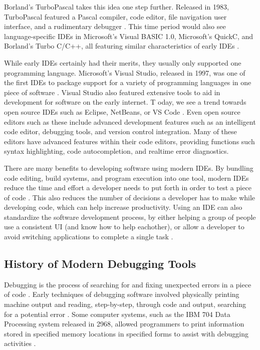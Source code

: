 \documentclass{article}
\begin{document}
Borland's TurboPascal takes this idea one step further. Released in 1983, TurboPascal featured a Pascal compiler, code editor, file navigation user interface, and a rudimentary debugger \cite{Gajic_2017, Intersimone_2010, Wadlow_1984}. This time period would also see language-specific IDEs in Microsoft's Visual BASIC 1.0, Microsoft's QuickC, and Borland's Turbo C/C++, all featuring similar characteristics of early IDEs \cite{Burgwin_2013, Plant_Murrell_2007, Posch_2023, Forer_Petreley_1991}.

While early IDEs certainly had their merits, they usually only supported one programming language. Microsoft's Visual Studio, released in 1997, was one of the first IDEs to package support for a variety of programming languages in one piece of software \cite{Microsoft_1997}. Visual Studio also featured extensive tools to aid in development for software on the early internet. 
T
oday, we see a trend towards open source IDEs such as Eclipse, NetBeans, or VS Code \cite{Apache_2023, EclipseFoundation_2023, Microsoft_2023a}. Even open source editors such as these include advanced development features such as an intelligent code editor, debugging tools, and version control integration. Many of these editors have advanced features within their code editors, providing functions such syntax highlighting, code autocompletion, and realtime error diagnostics. 

There are many benefits to developing software using modern IDEs. By bundling code editing, build systems, and program execution into one tool, modern IDEs reduce the time and effort a developer needs to put forth in order to test a piece of code \cite{Gillis_Silverthorne_2018}. This also reduces the number of decisions a developer has to make while developing code, which can help increase productivity. Using an IDE can also standardize the software development process, by either helping a group of people use a consistent UI (and know how to help eachother), or allow a developer to avoid switching applications to complete a single task \cite{Veracode_2020}. 

\subsection{History of Modern Debugging Tools}

Debugging is the process of searching for and fixing unexpected errors in a piece of code \cite{AWS_2023}. Early techniques of debugging software involved physically printing machine output and reading, step-by-step, through code and output, searching for a potential error \cite{RevDeBug_2020}. Some computer systems, such as the IBM 704 Data Processing system released in 2968, allowed programmers to print information stored in specified memory locations in specified forms to assist with debugging activities \cite{MIT_1957, IBMArchives_2023}. 
\end{document}
